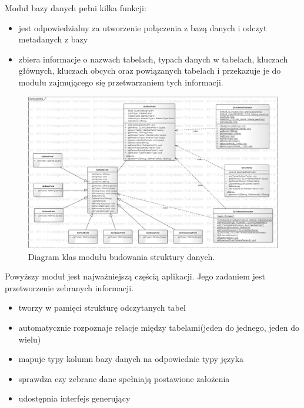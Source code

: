 \documentclass[12pt]{report}
\begin{document}
Moduł bazy danych pełni kilka funkcji:
\begin{itemize}
\item{jest odpowiedzialny za utworzenie połączenia z bazą danych i odczyt metadanych z bazy}
\item{zbiera informacje o nazwach tabelach, typach danych w tabelach, kluczach głównych, kluczach obcych oraz powiązanych tabelach i przekazuje je do modułu zajmującego się przetwarzaniem tych informacji.}
\end{itemize}

\begin{figure}[h]
	\centering
	\includegraphics[width=1.1\textwidth]{images/schema.png}
	\caption{Diagram klas modułu budowania struktury danych.}
\end{figure}
\FloatBarrier	

Powyższy moduł jest najważniejszą częścią aplikacji. Jego zadaniem jest przetworzenie zebranych informacji.
\begin{itemize}
\item{tworzy w pamięci strukturę odczytanych tabel}
\item{automatycznie rozpoznaje relacje między tabelami(jeden do jednego, jeden do wielu)}
\item{mapuje typy kolumn bazy danych na odpowiednie typy języka}
\item{sprawdza czy zebrane dane spełniają postawione założenia}
\item{udostępnia interfejs generujący}
\end{itemize}
\end{document}
